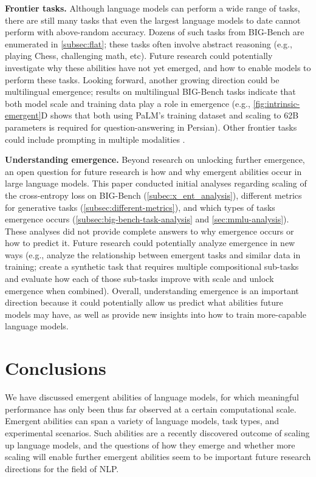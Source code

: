 \textbf{Frontier tasks.} Although language models can perform a wide range of tasks, there are still many tasks that even the largest language models to date cannot perform with above-random accuracy. Dozens of such tasks from BIG-Bench are enumerated in \ref{subsec:flat}; these tasks often involve abstract reasoning (e.g., playing Chess, challenging math, etc). Future research could potentially investigate why these abilities have not yet emerged, and how to enable models to perform these tasks. Looking forward, another growing direction could be multilingual emergence; results on  multilingual BIG-Bench tasks indicate that both model scale and training data play a role in emergence (e.g., \ref{fig:intrinsic-emergent}D shows that both using PaLM's training dataset and scaling to 62B parameters is required for question-answering in Persian). Other frontier tasks could include prompting in multiple modalities \citep{alayrac2022flamingo,ramesh2022hierarchical}.

\textbf{Understanding emergence.} Beyond research on unlocking further emergence, an open question for future research is how and why emergent abilities occur in large language models. This paper conducted initial analyses regarding scaling of the cross-entropy loss on BIG-Bench (\ref{subec:x_ent_analysis}), different metrics for generative tasks (\ref{subsec:different-metrics}), and which types of tasks emergence occurs (\ref{subsec:big-bench-task-analysis} and \ref{sec:mmlu-analysis}).
These analyses did not provide complete answers to why emergence occurs or how to predict it. Future research could potentially analyze emergence in new ways (e.g., analyze the relationship between emergent tasks and similar data in training; create a synthetic task that requires multiple compositional sub-tasks and evaluate how each of those sub-tasks improve with scale and unlock emergence when combined). Overall, understanding emergence is an important direction because it could potentially allow us predict what abilities future models may have, as well as provide new insights into how to train more-capable language models.

\section{Conclusions}
We have discussed emergent abilities of language models, for which meaningful performance has only been thus far observed at a certain computational scale. Emergent abilities can span a variety of language models, task types, and experimental scenarios. Such abilities are a recently discovered outcome of scaling up language models, and the questions of how they emerge and whether more scaling will enable further emergent abilities seem to be important future research directions for the field of NLP.


